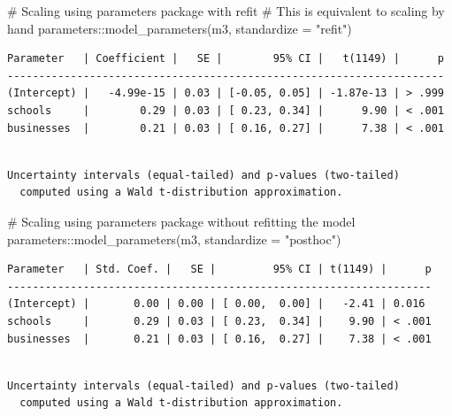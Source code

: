 \documentclass[
  letterpaper,
  DIV=11,
  numbers=noendperiod]{scrreprt}
\newenvironment{Shaded}{\begin{snugshade}}{\end{snugshade}}
\newcommand{\AttributeTok}[1]{\textcolor[rgb]{0.40,0.45,0.13}{#1}}
\newcommand{\CommentTok}[1]{\textcolor[rgb]{0.37,0.37,0.37}{#1}}
\newcommand{\FunctionTok}[1]{\textcolor[rgb]{0.28,0.35,0.67}{#1}}
\newcommand{\NormalTok}[1]{\textcolor[rgb]{0.00,0.23,0.31}{#1}}
\newcommand{\SpecialCharTok}[1]{\textcolor[rgb]{0.37,0.37,0.37}{#1}}
\newcommand{\StringTok}[1]{\textcolor[rgb]{0.13,0.47,0.30}{#1}}
\begin{document}
\begin{Shaded}
\begin{Highlighting}[]
\CommentTok{\# Scaling using \textquotesingle{}parameters\textquotesingle{} package with refit}
\CommentTok{\# This is equivalent to scaling \textquotesingle{}by hand\textquotesingle{}}
\NormalTok{parameters}\SpecialCharTok{::}\FunctionTok{model\_parameters}\NormalTok{(m3, }\AttributeTok{standardize =} \StringTok{"refit"}\NormalTok{)}
\end{Highlighting}
\end{Shaded}

\begin{verbatim}
Parameter   | Coefficient |   SE |        95% CI |   t(1149) |      p
---------------------------------------------------------------------
(Intercept) |   -4.99e-15 | 0.03 | [-0.05, 0.05] | -1.87e-13 | > .999
schools     |        0.29 | 0.03 | [ 0.23, 0.34] |      9.90 | < .001
businesses  |        0.21 | 0.03 | [ 0.16, 0.27] |      7.38 | < .001
\end{verbatim}

\begin{verbatim}

Uncertainty intervals (equal-tailed) and p-values (two-tailed)
  computed using a Wald t-distribution approximation.
\end{verbatim}

\begin{Shaded}
\begin{Highlighting}[]
\CommentTok{\# Scaling using \textasciigrave{}parameters\textasciigrave{} package without refitting the model}
\NormalTok{parameters}\SpecialCharTok{::}\FunctionTok{model\_parameters}\NormalTok{(m3, }\AttributeTok{standardize =} \StringTok{"posthoc"}\NormalTok{)}
\end{Highlighting}
\end{Shaded}

\begin{verbatim}
Parameter   | Std. Coef. |   SE |         95% CI | t(1149) |      p
-------------------------------------------------------------------
(Intercept) |       0.00 | 0.00 | [ 0.00,  0.00] |   -2.41 | 0.016 
schools     |       0.29 | 0.03 | [ 0.23,  0.34] |    9.90 | < .001
businesses  |       0.21 | 0.03 | [ 0.16,  0.27] |    7.38 | < .001
\end{verbatim}

\begin{verbatim}

Uncertainty intervals (equal-tailed) and p-values (two-tailed)
  computed using a Wald t-distribution approximation.
\end{verbatim}
\end{document}
